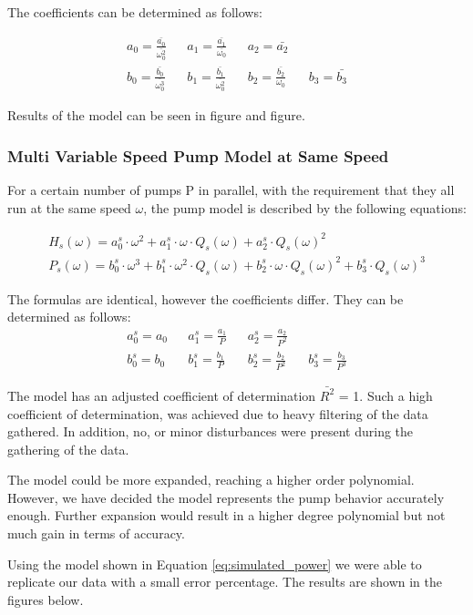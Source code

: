 The coefficients can be determined as follows:

\begin{align*}
	a_0 = \frac{\bar{a_0}}{\bar{\omega_0^2}} && a_1 = \frac{\bar{a_1}}{\bar{\omega_0}} && a_2 = \bar{a_2} \\
	b_0 = \frac{\bar{b_0}}{\bar{\omega_0^3}} && b_1 = \frac{\bar{b_1}}{\bar{\omega_0^2}} && b_2 = \frac{\bar{b_2}}{\omega_0} && b_3 = \bar{b_3}
\end{align*}

Results of the model can be seen in figure and figure.
\subsubsection{Multi Variable Speed Pump Model at Same Speed}
For a certain number of pumps P in parallel, with the requirement that they all run at the same speed $\omega$, the pump model is
described by the following equations:

\begin{equation}
	\begin{aligned}
	H_s(\omega) = a_0^s \cdot \omega^2 + a_1^s \cdot \omega \cdot Q_s(\omega) + a_2^s \cdot Q_s(\omega)^2 \\
	P_s(\omega) = b_0^s \cdot \omega^3 + b_1^s \cdot \omega^2 \cdot Q_s(\omega) + b_2^s \cdot \omega \cdot Q_s(\omega)^2 + b_3^s \cdot Q_s(\omega)^3
	\end{aligned}
\end{equation}

The formulas are identical, however the coefficients differ. They can be determined as follows:
\begin{align*}
	a_0^s = a_0 && a_1^s = \frac{a_1}{P} && a_2^s = \frac{a_2}{P^2} \\
	b_0^s = b_0 && b_1^s = \frac{b_1}{P} && b_2^s = \frac{b_2}{P^2} && b_3^s = \frac{b_3}{P^3}
\end{align*}

\newpage
The model has an adjusted coefficient of determination  $\bar{R^2}$ = 1. Such a high coefficient of determination, was achieved due to
heavy filtering of the data gathered. In addition, no, or minor disturbances were present during the gathering of the data.

The model could be more expanded, reaching a higher order polynomial. However, we have decided the model represents the pump behavior 
accurately enough. Further expansion would result in a higher degree polynomial but not much gain in terms of accuracy.

Using the model shown in Equation \ref{eq:simulated_power} we were able to replicate our data with a small error percentage. The results
are shown in the figures below.
